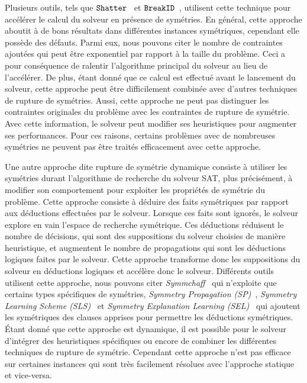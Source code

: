 Plusieurs outils, tels que $\texttt{Shatter}$~\cite{aloul06} et $\texttt{BreakID}$~\cite{devriendt2016improved}, utilisent cette technique pour accélérer le calcul du solveur en présence de symétries.
En général, cette approche aboutit à de bons résultats dans différentes instances symétriques, cependant elle possède des défauts. Parmi eux, nous pouvons citer le nombre de contraintes ajoutées qui peut être exponentiel par rapport à la taille du problème. Ceci a pour conséquence de ralentir l'algorithme principal du solveur au lieu de l'accélérer.
De plus, étant donné que ce calcul est effectué avant le lancement du solveur, cette approche peut être difficilement combinée avec d'autres techniques de rupture de symétries. Aussi, cette approche ne peut pas distinguer les contraintes originales du problème avec les contraintes de rupture de symétrie. Avec cette information, le solveur peut modifier ses heuristiques pour augmenter ses performances. Pour ces raisons, certains problèmes avec de nombreuses symétries ne peuvent pas être traités efficacement avec cette approche.

Une autre approche dite rupture de symétrie dynamique consiste à utiliser les symétries durant l'algorithme de recherche du solveur SAT, plus précisément, à modifier son comportement pour exploiter les propriétés de symétrie du problème. Cette approche consiste à déduire des faits symétriques par rapport aux déductions effectuées par le solveur. Lorsque ces faits sont ignorés, le solveur explore en vain l'espace de recherche symétrique.
Ces déductions réduisent le nombre de décisions, qui sont des suppositions du solveur choisies de 
manière heuristique, et augmentent le nombre de propagations qui sont les déductions logiques faites par le solveur. 
Cette approche transforme donc les suppositions du solveur en déductions logiques et accélère donc le solveur.
Différents outils utilisent cette approche, nous pouvons citer \textit{Symmchaff}~\cite{sabharwal2005symchaff}
qui n'exploite que certains types spécifiques de symétries, \textit{Symmetry Propagation (SP)}~\cite{Devriendt12}, \textit{Symmetry Learning Scheme (SLS)}~\cite{benhamou2010enhancing} et \textit{Symmetry Explanation Learning (SEL)}~\cite{devriendt2017symmetric} qui ajoutent les symétriques des clauses apprises pour permettre les déductions symétriques.
Étant donné que cette approche est dynamique, il est possible pour le solveur 
d'intégrer des heuristiques spécifiques ou encore de combiner les différentes techniques de rupture de symétrie.
Cependant cette approche n'est pas efficace sur certaines instances qui sont très facilement résolues avec l'approche statique
et vice-versa.


